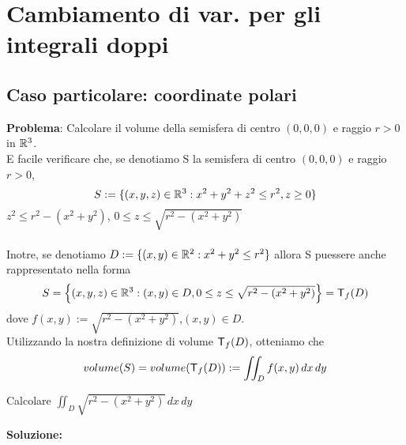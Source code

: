 \section{Cambiamento di var. per gli integrali doppi}
\subsection{Caso particolare: coordinate polari}
\textbf{Problema}: Calcolare il volume della semisfera di centro $(0,0,0)$ e raggio $r>0$ in $\mathbb{R}^3$. \\
\ac{E} facile verificare che, se denotiamo S la semisfera di centro $(0,0,0)$ e raggio $r>0$, 
$$S:=\{(x,y,z)\in\mathbb{R}^3 : x^2+y^2+z^2 \leq r^2, z\geq 0\}$$
$z^2 \leq r^2-(x^2+y^2)$, $0 \leq z \leq \sqrt{r^2-(x^2+y^2)}$ \\\\
Inotre, se denotiamo $D:=\{(x,y)\in\mathbb{R}^2:x^2+y^2 \leq r^2\}$ allora S pu\aco essere anche rappresentato
nella forma 
$$S = \left\{(x,y,z)\in\mathbb{R}^3:(x,y)\in D, 0 \leq z \leq \sqrt{r^2-(x^2+y^2)}\right\} = \mathsf{T}_{f}(D)$$
dove $f(x,y) := \sqrt{r^2-(x^2+y^2)}$,$(x,y)\in D$. \\
Utilizzando la nostra definizione di volume $\mathsf{T}_{f}(D)$, otteniamo che 
$$volume(S) = volume(\mathsf{T}_{f}(D)) := \iint_{D}f(x,y)\,dx\,dy$$
\begin{exercise}
  Calcolare $\iint_{D}\sqrt{r^2-(x^2+y^2)}\,dx\,dy$
\end{exercise}
\textbf{Soluzione:}
